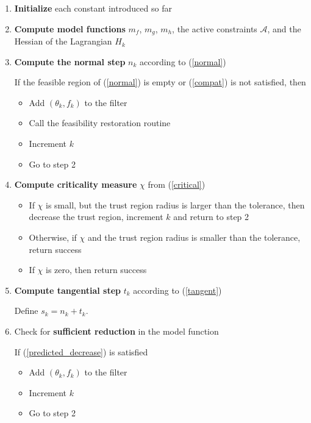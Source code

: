 \documentclass{article}
\let\oldref\ref
\renewcommand{\ref}[1]{(\oldref{#1})}
\begin{document}
\underline{\hspace{20cm}}
\FloatBarrier
\begin{enumerate}
\item \textbf{Initialize} each constant introduced so far

\item \textbf{Compute model functions} $m_f$, $m_g$, $m_h$, the active constraints $\mathcal A$, and the Hessian of the Lagrangian $H_k$

\item \textbf{Compute the normal step} $n_k$ according to \ref{normal}

If the feasible region of \ref{normal} is empty or \ref{compat} is not satisfied, then 
\begin{itemize}
\item Add $(\theta_k, f_k)$ to the filter
\item Call the feasibility restoration routine
\item Increment $k$
\item Go to step 2
\end{itemize}

\item \textbf{Compute criticality measure} $\chi$ from \ref{critical}
\begin{itemize}
\item If $\chi$ is small, but the trust region radius is larger than the tolerance, then decrease the trust region, increment $k$ and return to step 2
\item Otherwise, if $\chi$ and the trust region radius is smaller than the tolerance, return success
\item If $\chi$ is zero, then return success
\end{itemize}


\item \textbf{Compute tangential step} $t_k$ according to \ref{tangent}

Define $s_k = n_k + t_k$.

\item Check for \textbf{sufficient reduction} in the model function

If \ref{predicted_decrease} is satisfied
\begin{itemize}
\item Add $(\theta_k, f_k)$ to the filter
\item Increment $k$
\item Go to step 2
\end{itemize}


\end{enumerate}
\end{document}
